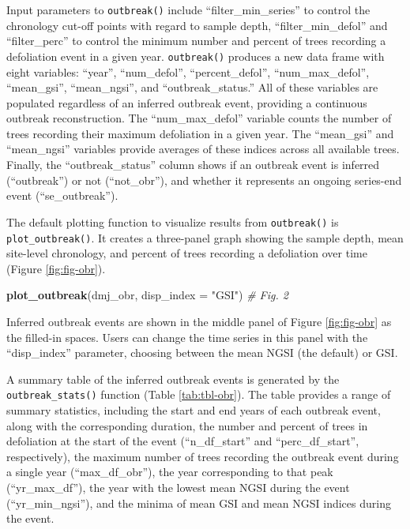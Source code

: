 \documentclass[review]{elsarticle} %
\newenvironment{Shaded}{\begin{snugshade}}{\end{snugshade}}
\newcommand{\CommentTok}[1]{\textcolor[rgb]{0.56,0.35,0.01}{\textit{#1}}}
\newcommand{\DataTypeTok}[1]{\textcolor[rgb]{0.13,0.29,0.53}{#1}}
\newcommand{\KeywordTok}[1]{\textcolor[rgb]{0.13,0.29,0.53}{\textbf{#1}}}
\newcommand{\NormalTok}[1]{#1}
\newcommand{\StringTok}[1]{\textcolor[rgb]{0.31,0.60,0.02}{#1}}
\begin{document}
Input parameters to \texttt{outbreak()} include ``filter\_min\_series'' to control the chronology cut-off points with regard to sample depth, ``filter\_min\_defol'' and ``filter\_perc'' to control the minimum number and percent of trees recording a defoliation event in a given year. \texttt{outbreak()} produces a new data frame with eight variables: ``year'', ``num\_defol'', ``percent\_defol'', ``num\_max\_defol'', ``mean\_gsi'', ``mean\_ngsi'', and ``outbreak\_status.'' All of these variables are populated regardless of an inferred outbreak event, providing a continuous outbreak reconstruction. The ``num\_max\_defol'' variable counts the number of trees recording their maximum defoliation in a given year. The ``mean\_gsi'' and ``mean\_ngsi'' variables provide averages of these indices across all available trees. Finally, the ``outbreak\_status'' column shows if an outbreak event is inferred (``outbreak'') or not (``not\_obr''), and whether it represents an ongoing series-end event (``se\_outbreak'').

The default plotting function to visualize results from \texttt{outbreak()} is \texttt{plot\_outbreak()}. It creates a three-panel graph showing the sample depth, mean site-level chronology, and percent of trees recording a defoliation over time (Figure \ref{fig:fig-obr}).

\begin{Shaded}
\begin{Highlighting}[]
\KeywordTok{plot_outbreak}\NormalTok{(dmj_obr, }\DataTypeTok{disp_index =} \StringTok{"GSI"}\NormalTok{) }\CommentTok{# Fig. 2}
\end{Highlighting}
\end{Shaded}

Inferred outbreak events are shown in the middle panel of Figure \ref{fig:fig-obr} as the filled-in spaces. Users can change the time series in this panel with the ``disp\_index'' parameter, choosing between the mean NGSI (the default) or GSI.

A summary table of the inferred outbreak events is generated by the \texttt{outbreak\_stats()} function (Table \ref{tab:tbl-obr}). The table provides a range of summary statistics, including the start and end years of each outbreak event, along with the corresponding duration, the number and percent of trees in defoliation at the start of the event (``n\_df\_start'' and ``perc\_df\_start'', respectively), the maximum number of trees recording the outbreak event during a single year (``max\_df\_obr''), the year corresponding to that peak (``yr\_max\_df''), the year with the lowest mean NGSI during the event (``yr\_min\_ngsi''), and the minima of mean GSI and mean NGSI indices during the event.
\end{document}
